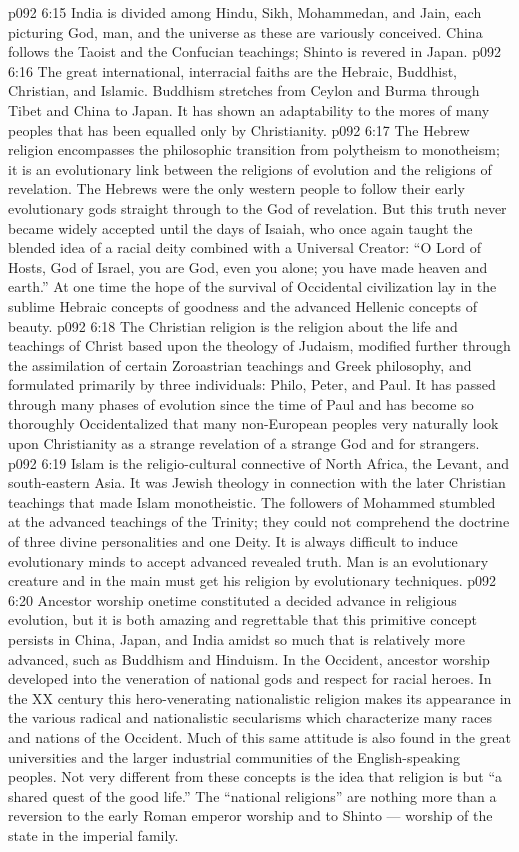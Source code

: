\vs p092 6:15 India is divided among Hindu, Sikh, Mohammedan, and Jain, each picturing God, man, and the universe as these are variously conceived. China follows the Taoist and the Confucian teachings; Shinto is revered in Japan.
\vs p092 6:16 The great international, interracial faiths are the Hebraic, Buddhist, Christian, and Islamic. Buddhism stretches from Ceylon and Burma through Tibet and China to Japan. It has shown an adaptability to the mores of many peoples that has been equalled only by Christianity.
\vs p092 6:17 The Hebrew religion encompasses the philosophic transition from polytheism to monotheism; it is an evolutionary link between the religions of evolution and the religions of revelation. The Hebrews were the only western people to follow their early evolutionary gods straight through to the God of revelation. But this truth never became widely accepted until the days of Isaiah, who once again taught the blended idea of a racial deity combined with a Universal Creator: “O Lord of Hosts, God of Israel, you are God, even you alone; you have made heaven and earth.” At one time the hope of the survival of Occidental civilization lay in the sublime Hebraic concepts of goodness and the advanced Hellenic concepts of beauty.
\vs p092 6:18 The Christian religion is the religion about the life and teachings of Christ based upon the theology of Judaism, modified further through the assimilation of certain Zoroastrian teachings and Greek philosophy, and formulated primarily by three individuals: Philo, Peter, and Paul. It has passed through many phases of evolution since the time of Paul and has become so thoroughly Occidentalized that many non\hyp{}European peoples very naturally look upon Christianity as a strange revelation of a strange God and for strangers.
\vs p092 6:19 Islam is the religio\hyp{}cultural connective of North Africa, the Levant, and south\hyp{}eastern Asia. It was Jewish theology in connection with the later Christian teachings that made Islam monotheistic. The followers of Mohammed stumbled at the advanced teachings of the Trinity; they could not comprehend the doctrine of three divine personalities and one Deity. It is always difficult to induce evolutionary minds  to accept advanced revealed truth. Man is an evolutionary creature and in the main must get his religion by evolutionary techniques.
\vs p092 6:20 \pc Ancestor worship onetime constituted a decided advance in religious evolution, but it is both amazing and regrettable that this primitive concept persists in China, Japan, and India amidst so much that is relatively more advanced, such as Buddhism and Hinduism. In the Occident, ancestor worship developed into the veneration of national gods and respect for racial heroes. In the XX century this hero\hyp{}venerating nationalistic religion makes its appearance in the various radical and nationalistic secularisms which characterize many races and nations of the Occident. Much of this same attitude is also found in the great universities and the larger industrial communities of the English\hyp{}speaking peoples. Not very different from these concepts is the idea that religion is but “a shared quest of the good life.” The “national religions” are nothing more than a reversion to the early Roman emperor worship and to Shinto --- worship of the state in the imperial family.
